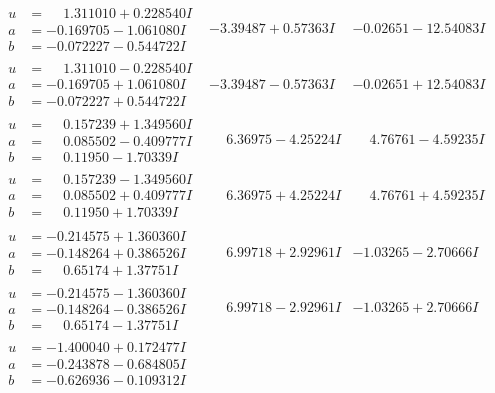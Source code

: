\documentclass[1p]{elsarticle_modified}
\theoremstyle{definition}
\begin{document}
$$\begin{array}{c|c|c}
\begin{aligned}
u &= \phantom{-}1.311010 + 0.228540 I \\
a &= -0.169705 - 1.061080 I \\
b &= -0.072227 - 0.544722 I\end{aligned}
 & -3.39487 + 0.57363 I & -0.02651 - 12.54083 I \\ \hline\begin{aligned}
u &= \phantom{-}1.311010 - 0.228540 I \\
a &= -0.169705 + 1.061080 I \\
b &= -0.072227 + 0.544722 I\end{aligned}
 & -3.39487 - 0.57363 I & -0.02651 + 12.54083 I \\ \hline\begin{aligned}
u &= \phantom{-}0.157239 + 1.349560 I \\
a &= \phantom{-}0.085502 - 0.409777 I \\
b &= \phantom{-}0.11950 - 1.70339 I\end{aligned}
 & \phantom{-}6.36975 - 4.25224 I & \phantom{-}4.76761 - 4.59235 I \\ \hline\begin{aligned}
u &= \phantom{-}0.157239 - 1.349560 I \\
a &= \phantom{-}0.085502 + 0.409777 I \\
b &= \phantom{-}0.11950 + 1.70339 I\end{aligned}
 & \phantom{-}6.36975 + 4.25224 I & \phantom{-}4.76761 + 4.59235 I \\ \hline\begin{aligned}
u &= -0.214575 + 1.360360 I \\
a &= -0.148264 + 0.386526 I \\
b &= \phantom{-}0.65174 + 1.37751 I\end{aligned}
 & \phantom{-}6.99718 + 2.92961 I & -1.03265 - 2.70666 I \\ \hline\begin{aligned}
u &= -0.214575 - 1.360360 I \\
a &= -0.148264 - 0.386526 I \\
b &= \phantom{-}0.65174 - 1.37751 I\end{aligned}
 & \phantom{-}6.99718 - 2.92961 I & -1.03265 + 2.70666 I \\ \hline\begin{aligned}
u &= -1.400040 + 0.172477 I \\
a &= -0.243878 - 0.684805 I \\
b &= -0.626936 - 0.109312 I\end{aligned}

\end{array}$$
\end{document}
